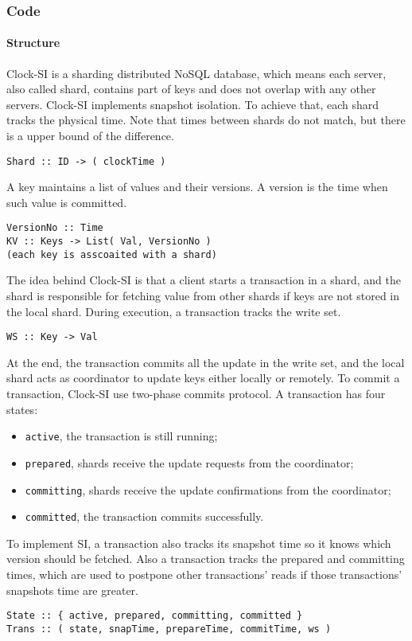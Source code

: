 \subsubsection{Code}

\paragraph{\bf Structure}
Clock-SI is a sharding distributed NoSQL database, which means 
each server, also called shard, contains part of keys and does not overlap with any other servers.
Clock-SI implements snapshot isolation.
To achieve that, each shard tracks the physical time.
Note that times between shards do not match,
but there is a upper bound of the difference.
\begin{lstlisting}[caption={Shard},label={lst:clock-si-shard}]
Shard :: ID -> ( clockTime )
\end{lstlisting}
A key maintains a list of values and their versions.
A version is the time when such value is committed.
\begin{lstlisting}[caption={Key-value store},label={lst:clock-si-key-value-store}]
VersionNo :: Time
KV :: Keys -> List( Val, VersionNo )
(each key is asscoaited with a shard)
\end{lstlisting}
The idea behind Clock-SI is that
a client starts a transaction in a shard, 
and the shard is responsible for fetching value from other shards
if keys are not stored in the local shard.
During execution, a transaction tracks the write set.
\begin{lstlisting}[caption={Write set},label={lst:clock-si-write-set}]
WS :: Key -> Val
\end{lstlisting}
At the end, the transaction commits all the update in the write set,
and the local shard acts as coordinator to update keys either locally or remotely.
To commit a transaction, Clock-SI use two-phase commits protocol.
A transaction has four states:
\begin{itemize}
    \item \verb|active|, the transaction is still running;
    \item \verb|prepared|, shards receive the update requests from the coordinator;
    \item \verb|committing|, shards receive the update confirmations from the coordinator;
    \item \verb|committed|, the transaction commits successfully.
\end{itemize}
To implement SI, a transaction also tracks its snapshot time 
so it knows which version should be fetched.
Also a transaction tracks the prepared and committing times,
which are used to postpone other transactions' reads 
if those transactions' snapshots time are greater.
\begin{lstlisting}[caption={Transaction runtime},label={lst:clock-si-trans-runtime}]
State :: { active, prepared, committing, committed }
Trans :: ( state, snapTime, prepareTime, commitTime, ws )
\end{lstlisting}

